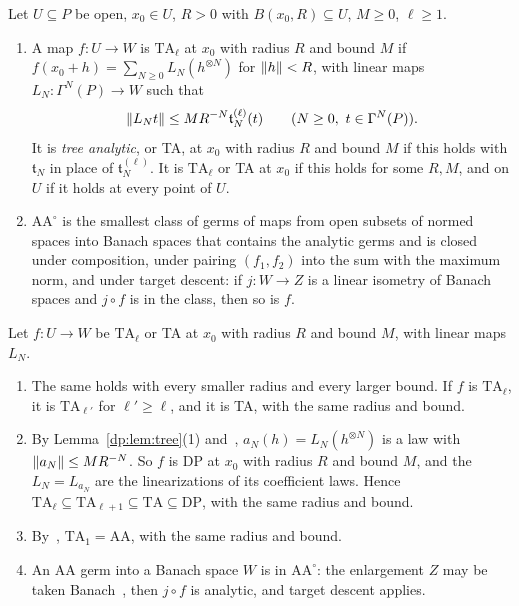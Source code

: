 \begin{definition}\label{dp:def:ta}
Let $U\subseteq P$ be open, $x_0\in U$, $R>0$ with $B(x_0,R)\subseteq U$, $M\ge0$, $\ell\ge1$.
\begin{enumerate}
\item A map $f\colon U\to W$ is $\mathrm{TA}_\ell$ at $x_0$ with radius $R$ and bound $M$ if $f(x_0+h)=\sum_{N\ge0}L_N(h^{\otimes N})$ for $\lVert h\rVert<R$, with linear maps $L_N\colon\Gamma^N(P)\to W$ such that
\begin{equation}\label{dp:eq:ta-bound}
 \norm{L_Nt}\le MR^{-N}\mathfrak t^{(\ell)}_N(t)\qquad(N\ge0,\ t\in\Gamma^N(P)).
\end{equation}
It is \emph{tree analytic}, or TA, at $x_0$ with radius $R$ and bound $M$ if this holds with $\mathfrak t_N$ in place of $\mathfrak t^{(\ell)}_N$. It is $\mathrm{TA}_\ell$ or TA at $x_0$ if this holds for some $R,M$, and on $U$ if it holds at every point of $U$.
\item $\mathrm{AA}^\circ$ is the smallest class of germs of maps from open subsets of normed spaces into Banach spaces that contains the analytic germs and is closed under composition, under pairing $(f_1,f_2)$ into the sum with the maximum norm, and under target descent: if $j\colon W\to Z$ is a linear isometry of Banach spaces and $j\circ f$ is in the class, then so is $f$.
\end{enumerate}
\end{definition}

\begin{remark}\label{dp:rem:ta-basic}
Let $f\colon U\to W$ be $\mathrm{TA}_\ell$ or TA at $x_0$ with radius $R$ and bound $M$, with linear maps $L_N$.
\begin{enumerate}
\item The same holds with every smaller radius and every larger bound. If $f$ is $\mathrm{TA}_\ell$, it is $\mathrm{TA}_{\ell'}$ for $\ell'\ge\ell$, and it is TA, with the same radius and bound.
\item By Lemma~\ref{dp:lem:tree}(1) and~\cite[Lemma~Q.1(2)]{I}, $a_N(h)=L_N(h^{\otimes N})$ is a law with $\lVert a_N\rVert\le MR^{-N}$. So $f$ is DP at $x_0$ with radius $R$ and bound $M$, and the $L_N=L_{a_N}$ are the linearizations of its coefficient laws. Hence $\mathrm{TA}_\ell\subseteq\mathrm{TA}_{\ell+1}\subseteq\mathrm{TA}\subseteq\mathrm{DP}$, with the same radius and bound.
\item By~\cite[Proposition~14.9(1)]{I}, $\mathrm{TA}_1=\mathrm{AA}$, with the same radius and bound.
\item An AA germ into a Banach space $W$ is in $\mathrm{AA}^\circ$: the enlargement $Z$ may be taken Banach~\cite[text after Definition~14.7]{I}, then $j\circ f$ is analytic, and target descent applies.
\end{enumerate}
\end{remark}


